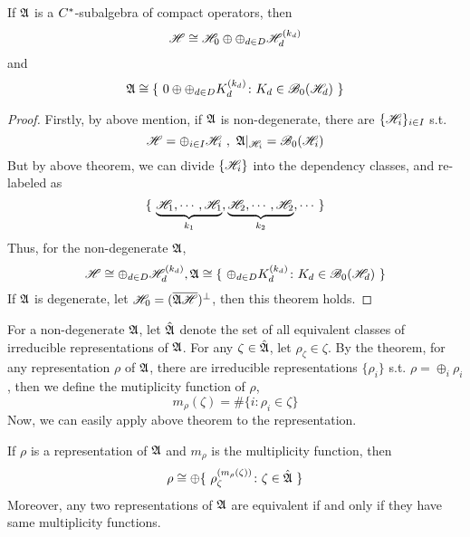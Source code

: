 \begin{thm}
	If $\mathfrak{A}$ is a $C^{*}$-subalgebra of compact operators, then
	\begin{equation*}
		\mathscr{H} \cong \mathscr{H}_0 \oplus \oplus_{d \in D} \mathscr{H}_d^{(k_d)}
	\end{equation*}
	and
	\begin{equation*}
		\mathfrak{A} \cong \{~0 \oplus \oplus_{d \in D} K_d^{(k_d)} \colon K_d \in \mathscr{B}_0(\mathscr{H}_d)~\}
	\end{equation*}
\end{thm}
\begin{proof}
	Firstly, by above mention, if $\mathfrak{A}$ is non-degenerate, there are $\{\mathscr{H}_i\}_{i \in I}$ s.t. 
	\begin{equation*}
		\mathscr{H} = \oplus_{i \in I} \mathscr{H}_i~,~ \mathfrak{A}|_{\mathscr{H}_i} = \mathscr{B}_0(\mathscr{H}_i)
	\end{equation*}
	But by above theorem, we can divide $\{\mathscr{H}_i\}$ into the dependency classes, and re-labeled as 
	\begin{equation*}
		\{~\underbrace{\mathscr{H}_1,\cdots,\mathscr{H}_1}_{k_1},\underbrace{\mathscr{H}_2,\cdots,\mathscr{H}_2}_{k_2}, \cdots~\}
	\end{equation*}
	Thus, for the non-degenerate $\mathfrak{A}$,
	\begin{equation*}
		\mathscr{H} \cong \oplus_{d \in D} \mathscr{H}_d^{(k_d)}, \mathfrak{A} \cong \{~\oplus_{d \in D} K_d^{(k_d)} \colon K_d \in \mathscr{B}_0(\mathscr{H}_d)~\}
	\end{equation*}
	If $\mathfrak{A}$ is degenerate, let $\mathscr{H}_0 = (\overline{\mathfrak{A} \mathscr{H}})^{\bot}$, then this theorem holds.
\end{proof}

For a non-degenerate $\mathfrak{A}$, let $\hat{\mathfrak{A}}$ denote the set of all equivalent classes of irreducible representations of $\mathfrak{A}$. For any $\zeta \in \hat{\mathfrak{A}}$, let $\rho_{\zeta} \in \zeta$. By the theorem, for any representation $\rho$ of $\mathfrak{A}$, there are irreducible representations $\{\rho_i\}$ s.t. $\rho = \oplus_i \rho_i$, then we define the mutiplicity function of $\rho$,
\begin{equation*}
	m_{\rho}(\zeta) = \#\{i \colon \rho_i \in \zeta\}
\end{equation*}
Now, we can easily apply above theorem to the representation. 

\begin{thm}
	If $\rho$ is a representation of $\mathfrak{A}$ and $m_{\rho}$ is the multiplicity function, then
	\begin{equation*}
		\rho \cong \oplus \{~\rho_{\zeta}^{(m_{\rho}(\zeta))} \colon \zeta \in \hat{\mathfrak{A}}~\}
	\end{equation*}
	Moreover, any two representations of $\mathfrak{A}$ are equivalent if and only if they have same multiplicity functions.
\end{thm}

